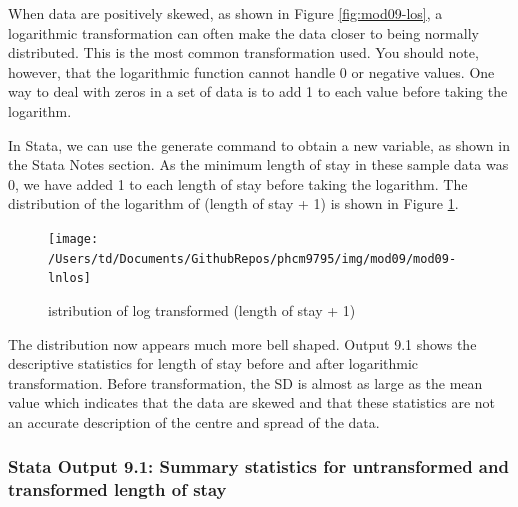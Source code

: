 \documentclass[
]{memoir}
\begin{document}
When data are positively skewed, as shown in Figure \ref{fig:mod09-los}, a logarithmic transformation can often make the data closer to being normally distributed. This is the most common transformation used. You should note, however, that the logarithmic function cannot handle 0 or negative values. One way to deal with zeros in a set of data is to add 1 to each value before taking the logarithm.

In Stata, we can use the generate command to obtain a new variable, as shown in the Stata Notes section. As the minimum length of stay in these sample data was 0, we have added 1 to each length of stay before taking the logarithm. The distribution of the logarithm of (length of stay + 1) is shown in Figure \ref{fig:mod09-lnlos}.

\begin{figure}
\texttt{[image: /Users/td/Documents/GithubRepos/phcm9795/img/mod09/mod09-lnlos]} \caption{istribution of log transformed (length of stay + 1)}\label{fig:mod09-lnlos}
\end{figure}

The distribution now appears much more bell shaped. Output 9.1 shows the descriptive statistics for length of stay before and after logarithmic transformation. Before transformation, the SD is almost as large as the mean value which indicates that the data are skewed and that these statistics are not an accurate description of the centre and spread of the data.

\hypertarget{stata-output-9.1-summary-statistics-for-untransformed-and-transformed-length-of-stay}{%
\subsubsection*{Stata Output 9.1: Summary statistics for untransformed and transformed length of stay}\label{stata-output-9.1-summary-statistics-for-untransformed-and-transformed-length-of-stay}}
\end{document}
